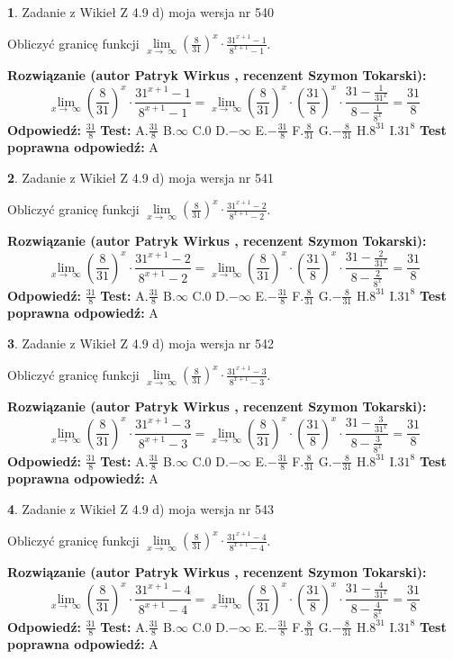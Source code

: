 \documentclass[12pt, a4paper]{article}
\theoremstyle{definition} %
\newtheorem{zad}{}
\newcommand{\zadStart}[1]{\begin{zad}#1\newline}
\newcommand{\zadStop}{\end{zad}}
\newcommand{\rozwStart}[2]{\noindent \textbf{Rozwiązanie (autor #1 , recenzent #2): }\newline}
\newcommand{\rozwStop}{\newline}
\newcommand{\odpStart}{\noindent \textbf{Odpowiedź:}\newline}
\newcommand{\odpStop}{\newline}
\newcommand{\testStart}{\noindent \textbf{Test:}\newline}
\newcommand{\testStop}{\newline}
\newcommand{\kluczStart}{\noindent \textbf{Test poprawna odpowiedź:}\newline}
\newcommand{\kluczStop}{\newline}
\begin{document}
\zadStart{Zadanie z Wikieł Z 4.9 d) moja wersja nr 540}


Obliczyć granicę funkcji  $\lim\limits_{x\to\ \infty}(\frac{8}{31})^{x}\cdot\frac{31^{x+1}-1}{8^{x+1}-1}$.
\zadStop
\rozwStart{Patryk Wirkus}{Szymon Tokarski}
$$\lim\limits_{x\to\ \infty}(\frac{8}{31})^{x}\cdot\frac{31^{x+1}-1}{8^{x+1}-1}=\lim\limits_{x\to\ \infty}(\frac{8}{31})^{x}\cdot(\frac{31}{8})^{x} \cdot \frac{31-\frac{1}{31^{x}}}{8-\frac{1}{8^{x}}} = \frac{31}{8}$$
\rozwStop
\odpStart
$\frac{31}{8}$
\odpStop
\testStart
A.$\frac{31}{8}$ B.$\infty$ C.$0$ D.$-\infty$ E.$-\frac{31}{8}$
F.$\frac{8}{31}$ G.$-\frac{8}{31}$
H.$8^{31}$
I.$31^{8}$
\testStop
\kluczStart
A
\kluczStop



\zadStart{Zadanie z Wikieł Z 4.9 d) moja wersja nr 541}


Obliczyć granicę funkcji  $\lim\limits_{x\to\ \infty}(\frac{8}{31})^{x}\cdot\frac{31^{x+1}-2}{8^{x+1}-2}$.
\zadStop
\rozwStart{Patryk Wirkus}{Szymon Tokarski}
$$\lim\limits_{x\to\ \infty}(\frac{8}{31})^{x}\cdot\frac{31^{x+1}-2}{8^{x+1}-2}=\lim\limits_{x\to\ \infty}(\frac{8}{31})^{x}\cdot(\frac{31}{8})^{x} \cdot \frac{31-\frac{2}{31^{x}}}{8-\frac{2}{8^{x}}} = \frac{31}{8}$$
\rozwStop
\odpStart
$\frac{31}{8}$
\odpStop
\testStart
A.$\frac{31}{8}$ B.$\infty$ C.$0$ D.$-\infty$ E.$-\frac{31}{8}$
F.$\frac{8}{31}$ G.$-\frac{8}{31}$
H.$8^{31}$
I.$31^{8}$
\testStop
\kluczStart
A
\kluczStop



\zadStart{Zadanie z Wikieł Z 4.9 d) moja wersja nr 542}


Obliczyć granicę funkcji  $\lim\limits_{x\to\ \infty}(\frac{8}{31})^{x}\cdot\frac{31^{x+1}-3}{8^{x+1}-3}$.
\zadStop
\rozwStart{Patryk Wirkus}{Szymon Tokarski}
$$\lim\limits_{x\to\ \infty}(\frac{8}{31})^{x}\cdot\frac{31^{x+1}-3}{8^{x+1}-3}=\lim\limits_{x\to\ \infty}(\frac{8}{31})^{x}\cdot(\frac{31}{8})^{x} \cdot \frac{31-\frac{3}{31^{x}}}{8-\frac{3}{8^{x}}} = \frac{31}{8}$$
\rozwStop
\odpStart
$\frac{31}{8}$
\odpStop
\testStart
A.$\frac{31}{8}$ B.$\infty$ C.$0$ D.$-\infty$ E.$-\frac{31}{8}$
F.$\frac{8}{31}$ G.$-\frac{8}{31}$
H.$8^{31}$
I.$31^{8}$
\testStop
\kluczStart
A
\kluczStop



\zadStart{Zadanie z Wikieł Z 4.9 d) moja wersja nr 543}


Obliczyć granicę funkcji  $\lim\limits_{x\to\ \infty}(\frac{8}{31})^{x}\cdot\frac{31^{x+1}-4}{8^{x+1}-4}$.
\zadStop
\rozwStart{Patryk Wirkus}{Szymon Tokarski}
$$\lim\limits_{x\to\ \infty}(\frac{8}{31})^{x}\cdot\frac{31^{x+1}-4}{8^{x+1}-4}=\lim\limits_{x\to\ \infty}(\frac{8}{31})^{x}\cdot(\frac{31}{8})^{x} \cdot \frac{31-\frac{4}{31^{x}}}{8-\frac{4}{8^{x}}} = \frac{31}{8}$$
\rozwStop
\odpStart
$\frac{31}{8}$
\odpStop
\testStart
A.$\frac{31}{8}$ B.$\infty$ C.$0$ D.$-\infty$ E.$-\frac{31}{8}$
F.$\frac{8}{31}$ G.$-\frac{8}{31}$
H.$8^{31}$
I.$31^{8}$
\testStop
\kluczStart
A
\kluczStop
\end{document}
